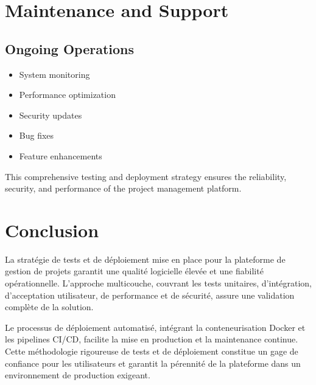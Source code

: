 \section{Maintenance and Support}
\subsection{Ongoing Operations}
\begin{itemize}
    \item System monitoring
    \item Performance optimization
    \item Security updates
    \item Bug fixes
    \item Feature enhancements
\end{itemize}

This comprehensive testing and deployment strategy ensures the reliability, security, and performance of the project management platform.

\section{Conclusion}

La stratégie de tests et de déploiement mise en place pour la plateforme de gestion de projets garantit une qualité logicielle élevée et une fiabilité opérationnelle. L'approche multicouche, couvrant les tests unitaires, d'intégration, d'acceptation utilisateur, de performance et de sécurité, assure une validation complète de la solution.

Le processus de déploiement automatisé, intégrant la conteneurisation Docker et les pipelines CI/CD, facilite la mise en production et la maintenance continue. Cette méthodologie rigoureuse de tests et de déploiement constitue un gage de confiance pour les utilisateurs et garantit la pérennité de la plateforme dans un environnement de production exigeant. 